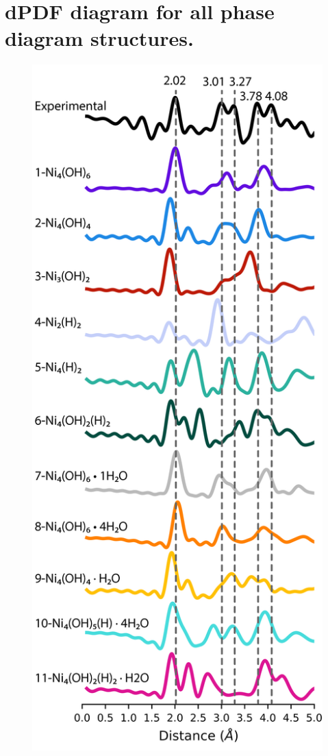 \documentclass[12pt]{article}
\begin{document}
\section{dPDF diagram for all phase diagram structures.}
\begin{figure}[H]
    \centering
    \includegraphics{zi-images/04-SI-images/2021-05-11-Ni-single-dPDF-ALL-SI-ALL.png}

\end{figure}
\end{document}
